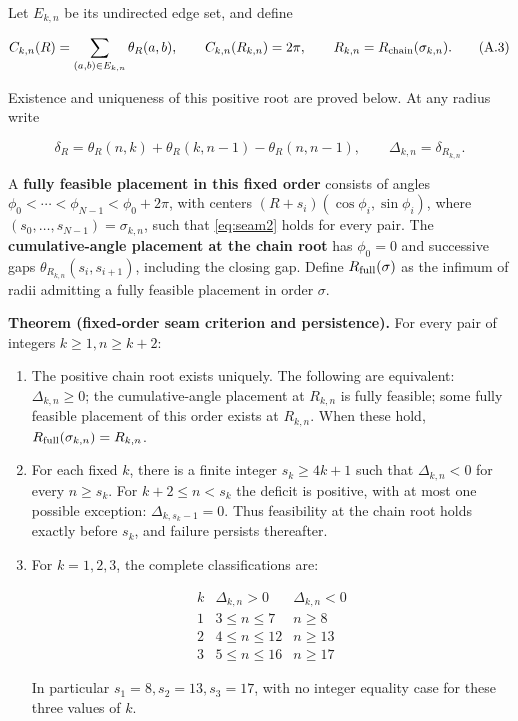 Let $E_{k,n}$ be its undirected edge set, and define

\[
 C_{k,n}(R)=\sum_{(a,b)\in E_{k,n}}\theta_R(a,b),\qquad
 C_{k,n}(R_{k,n})=2\pi,\qquad R_{k,n}=R_{\rm chain}(\sigma_{k,n}).
 \tag{A.3}\label{eq:seam3}
\]

Existence and uniqueness of this positive root are proved below. At any
radius write

\[
 \delta_R=\theta_R(n,k)+\theta_R(k,n-1)-\theta_R(n,n-1),\qquad
 \Delta_{k,n}=\delta_{R_{k,n}}.
 \tag{A.4}\label{eq:seam4}
\]

A \textbf{fully feasible placement in this fixed order} consists of angles
$\phi_0<\cdots<\phi_{N-1}<\phi_0+2\pi$, with centers
$(R+s_i)(\cos\phi_i,\sin\phi_i)$, where
$(s_0,\ldots,s_{N-1})=\sigma_{k,n}$, such that \eqref{eq:seam2} holds for every
pair. The \textbf{cumulative-angle placement at the chain root} has $\phi_0=0$
and successive gaps $\theta_{R_{k,n}}(s_i,s_{i+1})$, including the
closing gap. Define $R_{\rm full}(\sigma)$ as the infimum of radii
admitting a fully feasible placement in order $\sigma$.

\textbf{Theorem (fixed-order seam criterion and persistence).} For every pair of
integers $k\ge1,n\ge k+2$:

\begin{enumerate}
\item The positive chain root exists uniquely. The following are equivalent:
$\Delta_{k,n}\ge0$; the cumulative-angle placement at $R_{k,n}$
is fully feasible; some fully feasible placement of this order exists at
$R_{k,n}$. When these hold,
$R_{\rm full}(\sigma_{k,n})=R_{k,n}$.
\item For each fixed $k$, there is a finite integer
$s_k\ge4k+1$ such that $\Delta_{k,n}<0$ for every $n\ge s_k$.
For $k+2\le n<s_k$ the deficit is positive, with at most one
possible exception: $\Delta_{k,s_k-1}=0$. Thus feasibility at the
chain root holds exactly before $s_k$, and failure persists thereafter.
\item For $k=1,2,3$, the complete classifications are:\nopagebreak[4]

\[\begin{array}{c|c|c}k & \Delta_{k,n}>0 & \Delta_{k,n}<0\\1&3\le n\le7&n\ge8\\2&4\le n\le12&n\ge13\\3&5\le n\le16&n\ge17\end{array}\]

In particular $s_1=8,s_2=13,s_3=17$, with no integer equality
case for these three values of $k$.
\end{enumerate}

